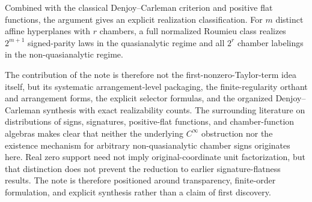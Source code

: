 \documentclass[11pt]{article}
\theoremstyle{definition}
\theoremstyle{remark}
\begin{document}
Combined with the classical Denjoy--Carleman criterion and positive flat functions, the argument gives an explicit realization classification. For $m$ distinct affine hyperplanes with $r$ chambers, a full normalized Roumieu class realizes $2^{m+1}$ signed-parity laws in the quasianalytic regime and all $2^r$ chamber labelings in the non-quasianalytic regime.

The contribution of the note is therefore not the first-nonzero-Taylor-term idea itself, but its systematic arrangement-level packaging, the finite-regularity orthant and arrangement forms, the explicit selector formulas, and the organized Denjoy--Carleman synthesis with exact realizability counts. The surrounding literature on distributions of signs, signatures, positive-flat functions, and chamber-function algebras makes clear that neither the underlying $C^\infty$ obstruction nor the existence mechanism for arbitrary non-quasianalytic chamber signs originates here. Real zero support need not imply original-coordinate unit factorization, but that distinction does not prevent the reduction to earlier signature-flatness results. The note is therefore positioned around transparency, finite-order formulation, and explicit synthesis rather than a claim of first discovery.
\end{document}
